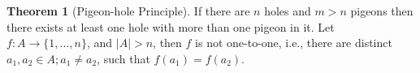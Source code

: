 \documentclass[fleqn, a4paper, 12pt, twoside]{article}
\theoremstyle{definition}
\theoremstyle{theorem}
\newtheorem{theorem}{Theorem}
\begin{document}
\begin{theorem}[Pigeon-hole Principle]
	If there are $n$ holes and $m > n$ pigeons then there exists at least one hole with more than one pigeon in it. Let $f : A \to \{ 1,...,n \}$, and $|A| > n$, then $f$ is not one-to-one, i.e., there are distinct $a_1, a_2 \in A ; a_1 \neq a_2$, such that $f(a_1) = f(a_2)$.
\end{theorem}
\end{document}

